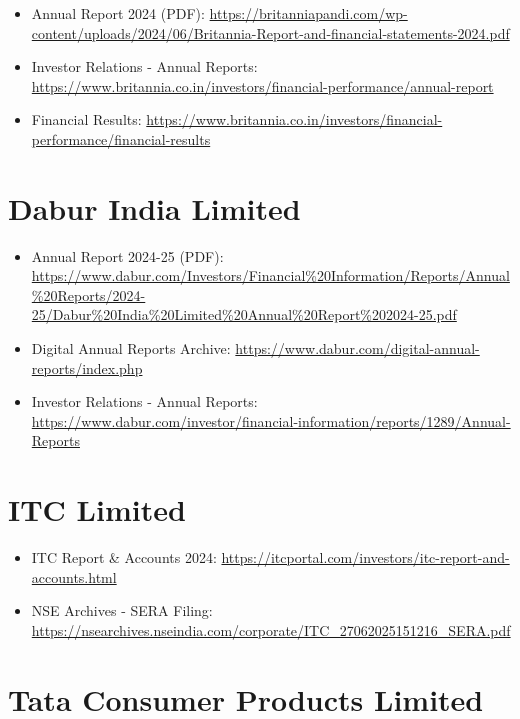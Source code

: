\documentclass[12pt, a4paper]{report}
\begin{document}
\begin{itemize}
    \item Annual Report 2024 (PDF): \url{https://britanniapandi.com/wp-content/uploads/2024/06/Britannia-Report-and-financial-statements-2024.pdf}
    
    \item Investor Relations - Annual Reports: \url{https://www.britannia.co.in/investors/financial-performance/annual-report}
    
    \item Financial Results: \url{https://www.britannia.co.in/investors/financial-performance/financial-results}
\end{itemize}

\section{Dabur India Limited}

\begin{itemize}
    \item Annual Report 2024-25 (PDF): \url{https://www.dabur.com/Investors/Financial%20Information/Reports/Annual%20Reports/2024-25/Dabur%20India%20Limited%20Annual%20Report%202024-25.pdf}
    
    \item Digital Annual Reports Archive: \url{https://www.dabur.com/digital-annual-reports/index.php}
    
    \item Investor Relations - Annual Reports: \url{https://www.dabur.com/investor/financial-information/reports/1289/Annual-Reports}
\end{itemize}

\section{ITC Limited}

\begin{itemize}
    \item ITC Report \& Accounts 2024: \url{https://itcportal.com/investors/itc-report-and-accounts.html}
    
    \item NSE Archives - SERA Filing: \url{https://nsearchives.nseindia.com/corporate/ITC_27062025151216_SERA.pdf}
\end{itemize}

\section{Tata Consumer Products Limited}
\end{document}
